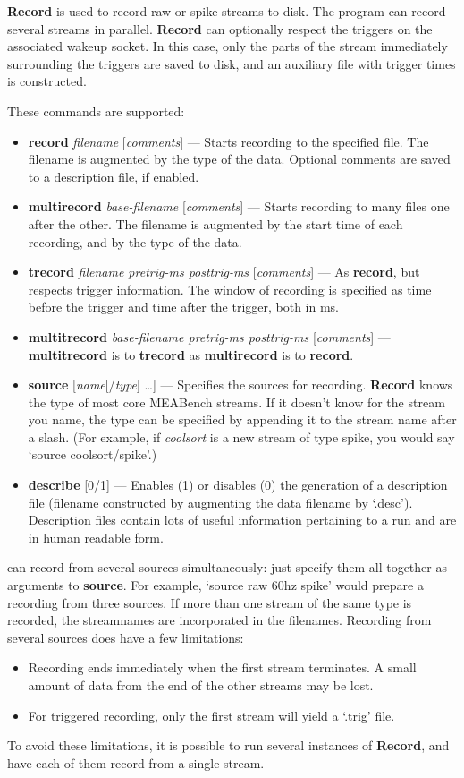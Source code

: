 \documentclass[12pt,oneside]{book}
\def\meabench{{MEABench}\xspace}
\def\prog#1{{\bf #1}}
\def\cmd#1{{\bf #1}}
\def\arg#1{{\it #1}}
\def\stream#1{{\it #1}\xspace}
\def\streamtype#1{{\sc #1}\xspace}
\def\raw{\streamtype{raw}}
\def\spike{\streamtype{spike}}
\begin{document}
\prog{Record} is used to record \raw or \spike streams to disk.
The program can record several streams in parallel. \prog{Record} can
optionally respect the triggers on the associated wakeup socket. In
this case, only the parts of the stream immediately surrounding the
triggers are saved to disk, and an auxiliary file with trigger times
is constructed.

These commands are supported:

\begin{itemize}
\item \cmd{record} \arg{filename} [\arg{comments}] --- Starts recording to the
specified file. The filename is augmented by the type of the data.
Optional comments are saved to a description file, if enabled.
\item \cmd{multirecord} \arg{base-filename} [\arg{comments}] --- Starts recording
to many files one after the other. The filename is augmented by the
start time of each recording, and by the type of the data.
\item \cmd{trecord} \arg{filename pretrig-ms posttrig-ms} [\arg{comments}] --- As
\cmd{record}, but respects trigger information. The window of
recording is specified as time before the trigger and time after the
trigger, both in ms.
\item \cmd{multitrecord} \arg{base-filename pretrig-ms posttrig-ms}
[\arg{comments}] --- \cmd{multitrecord} is to \cmd{trecord} as
\cmd{multirecord} is to \cmd{record}.
\item \cmd{source} [\arg{name}[/\arg{type}] \ldots] --- Specifies the sources for
recording. \cmd{Record} knows the type of most core \meabench streams.
If it doesn't know for the stream you name, the type can be specified
by appending it to the stream name after a slash. (For example, if
\stream{coolsort} is  a new stream of type \spike, you would say
`source coolsort/spike'.) 
\item \cmd{describe} [0/1] --- Enables (1) or disables (0) the
generation of a description file (filename constructed by augmenting
the data filename by `.desc'). Description files contain lots of
useful information pertaining to a run and are in human readable form.
\end{itemize}

\noindent \prog{Record} can record from several sources simultaneously: just
specify them all together as arguments to \cmd{source}. For example,
`source raw 60hz spike' would prepare a recording from three sources.
If more than one stream of the same type is recorded, the streamnames
are incorporated in the filenames. Recording from several sources does
have a few limitations:
\begin{itemize}
\item Recording ends immediately when the first stream terminates. A
small amount of data from the end of the other streams may be lost.
\item For triggered recording, only the first stream will yield a
`.trig' file.
\end{itemize}
To avoid these limitations, it is possible to run several instances of
\prog{Record}, and have each of them record from a single stream. 
\end{document}
